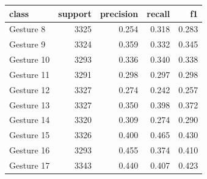 \begin{tabular}{lrrrr}
\toprule
class & support & precision & recall & f1 \\
\midrule
Gesture 8 & 3325 & 0.254 & 0.318 & 0.283 \\
Gesture 9 & 3324 & 0.359 & 0.332 & 0.345 \\
Gesture 10 & 3293 & 0.336 & 0.340 & 0.338 \\
Gesture 11 & 3291 & 0.298 & 0.297 & 0.298 \\
Gesture 12 & 3327 & 0.274 & 0.242 & 0.257 \\
Gesture 13 & 3327 & 0.350 & 0.398 & 0.372 \\
Gesture 14 & 3320 & 0.309 & 0.274 & 0.290 \\
Gesture 15 & 3326 & 0.400 & 0.465 & 0.430 \\
Gesture 16 & 3293 & 0.455 & 0.374 & 0.410 \\
Gesture 17 & 3343 & 0.440 & 0.407 & 0.423 \\
\bottomrule
\end{tabular}
